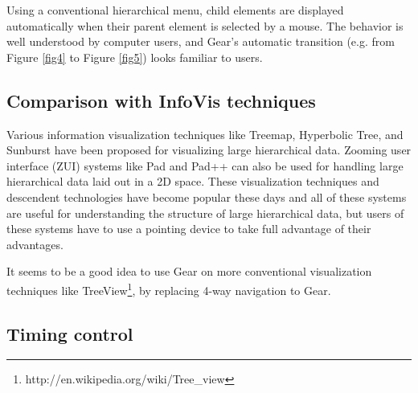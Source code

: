\documentclass{article}
\begin{document}
Using a conventional hierarchical menu,
child elements are displayed automatically when their parent element is selected by a mouse.
The behavior is well understood by computer users,
and Gear's automatic transition (e.g. from Figure \ref{fig4} to Figure \ref{fig5})
looks familiar to users.

\subsection{Comparison with InfoVis techniques}

Various information visualization techniques like
Treemap\cite{Johnson:1991:TSA:949607.949654},
Hyperbolic Tree\cite{Lamping:1995:FTB:223904.223956},
and Sunburst\cite{Stasko:2000:FDN:857190.857683}
have been proposed for visualizing large hierarchical data.
Zooming user interface (ZUI) systems like
Pad\cite{Perlin:1993:PAA:166117.166125} and
Pad++\cite{Bederson:1994:PZG:192426.192435}
can also be used for handling large hierarchical data laid out in a 2D space.
%
These visualization techniques and descendent technologies have become popular these days and
all of these systems are useful for understanding the structure of
large hierarchical data, but users of these systems have to use a pointing device
to take full advantage of their advantages.



It seems to be a good idea to use Gear on more conventional visualization techniques like
TreeView\footnote{
  \textsf{http://en.wikipedia.org/wiki/Tree\_view}
}, by replacing 4-way navigation to Gear.


\subsection{Timing control}
\end{document}
